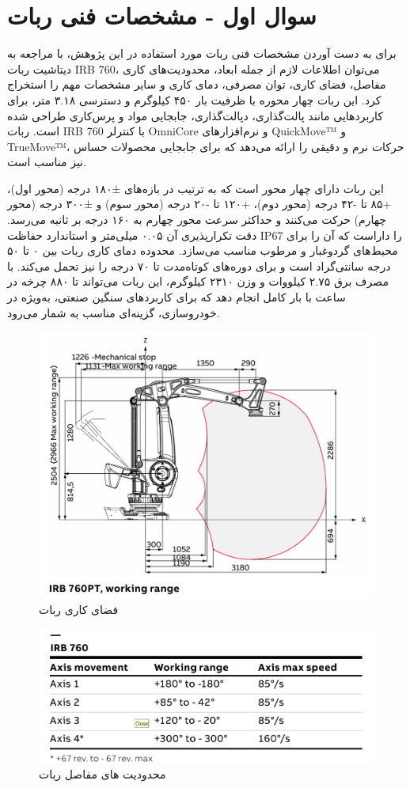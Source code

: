 \documentclass{article}
\begin{document}


\tableofcontents \clearpage
\listoffigures \clearpage
\newpage

\section{سوال اول - مشخصات فنی ربات}\label{Section1}

برای به دست آوردن مشخصات فنی ربات مورد استفاده در این پژوهش، با مراجعه به دیتاشیت ربات IRB 760، می‌توان اطلاعات لازم از جمله ابعاد، محدودیت‌های کاری مفاصل، فضای کاری، توان مصرفی، دمای کاری و سایر مشخصات مهم را استخراج کرد. این ربات چهار محوره با ظرفیت بار ۴۵۰ کیلوگرم و دسترسی ۳.۱۸ متر، برای کاربردهایی مانند پالت‌گذاری، دپالت‌گذاری، جابجایی مواد و پرس‌کاری طراحی شده است. ربات IRB 760 با کنترلر OmniCore و نرم‌افزارهای QuickMove™ و TrueMove™، حرکات نرم و دقیقی را ارائه می‌دهد که برای جابجایی محصولات حساس نیز مناسب است.

این ربات دارای چهار محور است که به ترتیب در بازه‌های ±۱۸۰ درجه (محور اول)، +۸۵ تا -۴۲ درجه (محور دوم)، +۱۲۰ تا -۲۰ درجه (محور سوم) و ±۳۰۰ درجه (محور چهارم) حرکت می‌کنند و حداکثر سرعت محور چهارم به ۱۶۰ درجه بر ثانیه می‌رسد. دقت تکرارپذیری آن ۰.۰۵ میلی‌متر و استاندارد حفاظت IP67 را داراست که آن را برای محیط‌های گردوغبار و مرطوب مناسب می‌سازد. محدوده دمای کاری ربات بین ۰ تا ۵۰ درجه سانتی‌گراد است و برای دوره‌های کوتاه‌مدت تا ۷۰ درجه را نیز تحمل می‌کند. با مصرف برق ۲.۷۵ کیلووات و وزن ۲۳۱۰ کیلوگرم، این ربات می‌تواند تا ۸۸۰ چرخه در ساعت با بار کامل انجام دهد که برای کاربردهای سنگین صنعتی، به‌ویژه در خودروسازی، گزینه‌ای مناسب به شمار می‌رود.

\begin{figure}[H]
    \centering
    \includegraphics[width=0.75\linewidth]{Working_Range.png}
    \caption{فضای کاری ربات}
    \label{fig:enter-label}
\end{figure}
\begin{figure}[H]
    \centering
    \includegraphics[width=0.5\linewidth]{Links_Working_Rangepng.png}
    \caption{محدودیت های مفاصل ربات}
    \label{fig:enter-label}
\end{figure}
\end{document}
